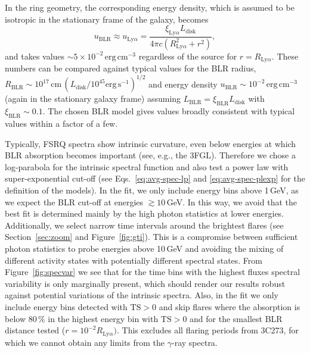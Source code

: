 \documentclass[twocolumn,linenumbers]{aastex62}
\newcommand{\gray}{$\gamma$-ray\xspace}
\begin{document}
In the ring geometry, the corresponding energy density, which is assumed to be isotropic in the stationary frame of the galaxy, becomes~\citep{finke2016}
    \begin{equation}
        u_\mathrm{BLR} \approx u_{\mathrm{Ly}\alpha}= \frac{\xi_{\mathrm{Ly}\alpha}L_\mathrm{disk}}{4\pi c(R_{\mathrm{Ly}\alpha}^2 + r^2)},
        \label{eq:u-blr}
    \end{equation}
and takes values $\sim 5\times10^{-2}\,\mathrm{erg}\,\mathrm{cm}^{-3}$ regardless of the source for $r = R_{\mathrm{Ly}\alpha}$.
These numbers can be compared against typical values for the BLR radius, $R_\mathrm{BLR} \sim 10^{17}\,\mathrm{cm}\, (L_\mathrm{disk} / 10^{45} \mathrm{erg}\,\mathrm{s}^{-1})^{1/2}$ \citep[e.g.][]{2007ApJ...659..997K,2009ApJ...697..160B} and energy density $u_\mathrm{BLR} \sim 10^{-2}\,\mathrm{erg}\,\mathrm{cm}^{-3} $ (again in the stationary galaxy frame) assuming  $L_\mathrm{BLR} = \xi_\mathrm{BLR} L_\mathrm{disk}$ with $\xi_\mathrm{BLR}\sim 0.1$. 
The chosen BLR model gives values broadly consistent with typical values within a factor of a few.

Typically, FSRQ spectra show intrinsic curvature, even below energies at which BLR absorption becomes important (see, e.g., the 3FGL). Therefore we chose a log-parabola for the intrinsic spectral function and also test a power law with super-exponential cut-off (see Eqs.~\ref{eq:avg-spec-lp} and \ref{eq:avg-spec-plexp} for the definition of the models). 
In the fit, we only include energy bins above 1\,GeV, as we expect the BLR cut-off at energies $\gtrsim 10\,$GeV. In this way, we avoid that the best fit is determined mainly by the high photon statistics at lower energies.
Additionally, we select narrow time intervals around the brightest flares (see Section~\ref{sec:zoom} and Figure~\ref{fig:gti}).
This is a compromise between sufficient photon statistics to probe energies above 10\,GeV and avoiding the mixing of different activity states with potentially different spectral states. 
From Figure~\ref{fig:specvar} we see that for the time bins with the highest fluxes spectral variability is only marginally present, which should render our results robust against potential variations of the intrinsic spectra. 
Also, in the fit we only include energy bins detected with $\mathrm{TS} > 0$ and skip flares where the absorption is below 80\,\% in the highest energy bin with $\mathrm{TS} > 0$ and for the smallest BLR distance tested ($r = 10^{-2}R_{\mathrm{Ly}\alpha})$. 
This excludes all flaring periods from 3C273, for which we cannot obtain any limits from the \gray spectra.
\end{document}
